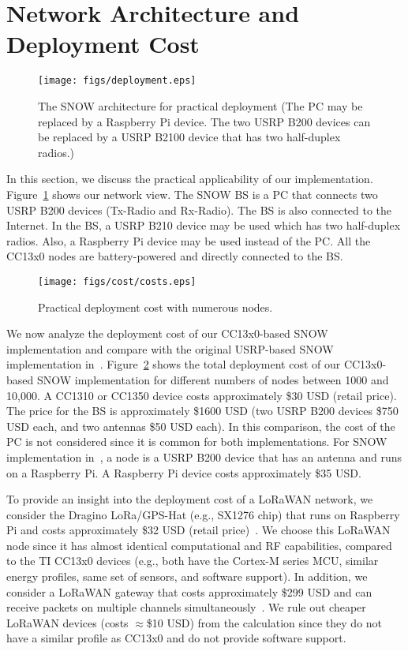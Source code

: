 \section{Network Architecture and Deployment Cost}\label{sec:deploy}
\begin{figure}[!htb]
\centering
\texttt{[image: figs/deployment.eps]}
\caption{The SNOW architecture for practical deployment (The PC may be replaced by a Raspberry Pi device. The two USRP B200 devices can be replaced by a USRP B2100 device that has two half-duplex radios.)}
\label{fig:deployment}
\end{figure}
In this section, we discuss the practical applicability of our implementation. Figure~\ref{fig:deployment} shows our network view. The SNOW BS is a PC that connects two USRP B200 devices (Tx-Radio and Rx-Radio). The BS is also connected to the Internet. In the BS, a USRP B210 device may be used which has two half-duplex radios. Also, a Raspberry Pi device may be used instead of the PC. All the CC13x0 nodes are battery-powered and directly connected to the BS. 
\begin{figure}[!htb]
\centering
\texttt{[image: figs/cost/costs.eps]}
\caption{Practical deployment cost with numerous nodes.}
\label{fig:cost}
\end{figure}

We now analyze the deployment cost of our CC13x0-based SNOW implementation and compare with the original USRP-based SNOW implementation in~\cite{snow_ton}. 
Figure~\ref{fig:cost} shows the total deployment cost of our CC13x0-based SNOW implementation for different numbers of nodes between 1000 and 10,000. A CC1310 or CC1350 device costs approximately \$30 USD (retail price). The price for the BS is approximately \$1600 USD (two USRP B200 devices \$750 USD each, and two antennas \$50 USD each). In this comparison, the cost of the PC is not considered since it is common for both implementations. For SNOW implementation in~\cite{snow_ton}, a node is a  USRP B200 device that has an antenna and runs on a Raspberry Pi. A Raspberry Pi device costs approximately \$35 USD.

To provide an insight into the deployment cost of a LoRaWAN network, we consider the Dragino LoRa/GPS-Hat (e.g., SX1276 chip) that runs on Raspberry Pi and costs approximately \$32 USD (retail price)~\cite{dragino}. We choose this LoRaWAN node since it has almost identical computational and RF capabilities, compared to the TI CC13x0 devices (e.g., both have the Cortex-M series MCU, similar energy profiles, same set of sensors, and software support). In addition, we consider a LoRaWAN gateway that costs approximately \$299 USD and can receive packets on multiple channels simultaneously~\cite{loracost}. We rule out cheaper LoRaWAN devices (costs $\approx$\$10 USD) from the calculation since they do not have a similar profile as CC13x0 and do not provide software support.

